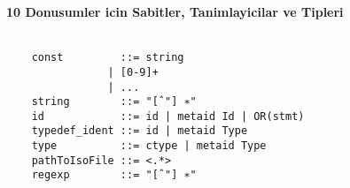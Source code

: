 \documentclass[22pt]{article}
\begin{document}
\textbf{10 Donusumler icin Sabitler, Tanimlayicilar ve Tipleri}\\
\\
\begin{lstlisting}
	const         ::= string 
		        | [0-9]+
		        | ...
	string        ::= "[ˆ"] ∗"
	id            ::= id | metaid Id | OR(stmt)
	typedef_ident ::= id | metaid Type
	type          ::= ctype | metaid Type
	pathToIsoFile ::= <.*>
	regexp        ::= "[ˆ"] ∗"
\end{lstlisting}
\end{document}
